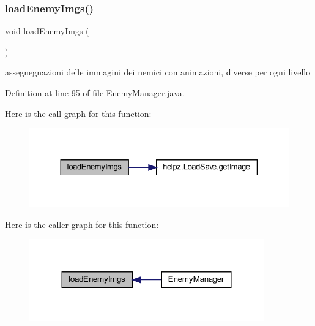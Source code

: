 \subsubsection{\texorpdfstring{load\+Enemy\+Imgs()}{loadEnemyImgs()}}
{\footnotesize\ttfamily void load\+Enemy\+Imgs (\begin{DoxyParamCaption}{ }\end{DoxyParamCaption})\hspace{0.3cm}{\ttfamily [private]}}



assegnegnazioni delle immagini dei nemici con animazioni, diverse per ogni livello 



Definition at line 95 of file Enemy\+Manager.\+java.

Here is the call graph for this function\+:\nopagebreak
\begin{figure}[H]
\begin{center}
\leavevmode
\includegraphics[width=330pt]{classmanagers_1_1_enemy_manager_a774aefe7ec0626eb37d65a2335eade3b_cgraph}
\end{center}
\end{figure}
Here is the caller graph for this function\+:\nopagebreak
\begin{figure}[H]
\begin{center}
\leavevmode
\includegraphics[width=287pt]{classmanagers_1_1_enemy_manager_a774aefe7ec0626eb37d65a2335eade3b_icgraph}
\end{center}
\end{figure}
\mbox{\label{classmanagers_1_1_enemy_manager_a839e4729819875981f138997b2d3f438}} 

